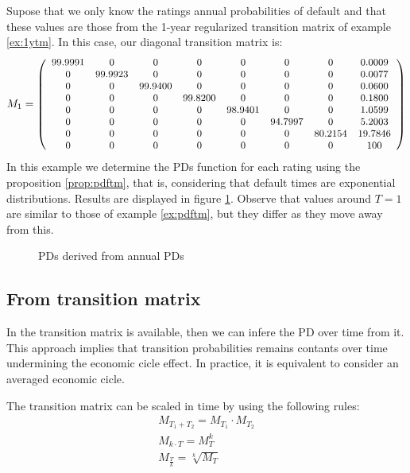 \documentclass[11pt,fleqn]{book} %
\begin{document}
\begin{example}
	\label{ex:pdfsv}
	Supose that we only know the ratings annual probabilities of default 
	and that these values are those from the 1-year regularized transition 
	matrix of example \ref{ex:1ytm}. In this case, our diagonal transition 
	matrix is:
	\begin{displaymath}
		M_1 = \left(
		\small
		\begin{array}{cccccccc}
		99.9991 & 0 & 0 & 0 & 0 & 0 & 0 & 0.0009 \\
		0 & 99.9923 & 0 & 0 & 0 & 0 & 0 & 0.0077 \\
		0 & 0 & 99.9400 & 0 & 0 & 0 & 0 & 0.0600 \\
		0 & 0 & 0 & 99.8200 & 0 & 0 & 0 & 0.1800 \\
		0 & 0 & 0 & 0 & 98.9401 & 0 & 0 & 1.0599 \\
		0 & 0 & 0 & 0 & 0 & 94.7997 & 0 & 5.2003 \\
		0 & 0 & 0 & 0 & 0 & 0 & 80.2154 & 19.7846 \\
		0 & 0 & 0 & 0 & 0 & 0 & 0 & 100 \\
		\end{array}
		\right)
	\end{displaymath}
	In this example we determine the PDs function for each rating using 
	the proposition \ref{prop:pdftm}, that is, considering that default
	times are exponential distributions. Results are displayed in figure 
	\ref{fig:pdfsv}. Observe that values around $T=1$ are similar to those 
	of example \ref{ex:pdftm}, but they differ as they move away from this.
\end{example}
\begin{figure}[ht]
	\centering
	\caption{PDs derived from annual PDs}
	\label{fig:pdfsv}
\end{figure}

\subsection{From transition matrix}

In the transition matrix is available, then we can infere the PD over 
time from it. This approach implies that transition 
probabilities remains contants over time undermining the economic 
cicle effect. In practice, it is equivalent to consider an averaged 
economic cicle.

\begin{proposition}
	The transition matrix can be scaled in time by using the following rules:
	\begin{equation}
		\label{sttm}
		\begin{array}{l}
			M_{T_1+T_2} = M_{T_1} \cdot M_{T_2} \nonumber \\
			M_{k \cdot T} = M_{T}^k \nonumber             \\
			M_{\frac{T}{k}} = \sqrt[k]{M_{T}} \nonumber   
		\end{array}
	\end{equation}
\end{proposition}
\end{document}
